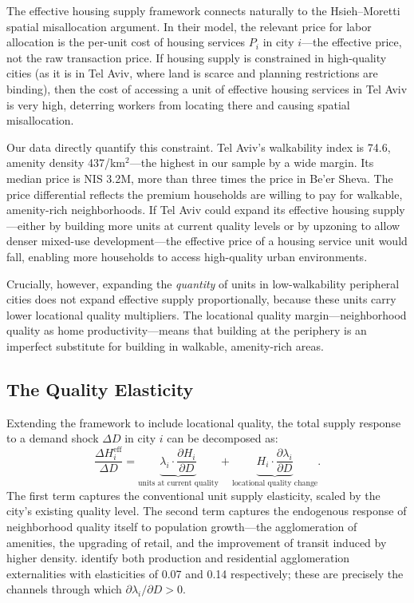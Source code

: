 \documentclass[12pt,a4paper]{article}
\begin{document}
The effective housing supply framework connects naturally to the Hsieh--Moretti
spatial misallocation argument.  In their model, the relevant price for labor
allocation is the per-unit cost of housing services $P_i$ in city $i$—the
effective price, not the raw transaction price.  If housing supply is
constrained in high-quality cities (as it is in Tel Aviv, where land is scarce
and planning restrictions are binding), then the cost of accessing a unit of
effective housing services in Tel Aviv is very high, deterring workers from
locating there and causing spatial misallocation.

Our data directly quantify this constraint.  Tel Aviv's walkability index is 74.6,
amenity density 437/km$^2$—the highest in our sample by a wide margin.  Its
median price is NIS 3.2M, more than three times the price in Be'er Sheva.
The price differential reflects the premium households are willing to pay for
walkable, amenity-rich neighborhoods.  If Tel Aviv could expand its effective
housing supply—either by building more units at current quality levels or by
upzoning to allow denser mixed-use development—the effective price of a housing
service unit would fall, enabling more households to access high-quality urban
environments.

Crucially, however, expanding the \textit{quantity} of units in low-walkability
peripheral cities does not expand effective supply proportionally, because these
units carry lower locational quality multipliers.  The locational quality
margin—neighborhood quality as home productivity—means that building at the
periphery is an imperfect substitute for building in walkable, amenity-rich
areas.

\subsection{The Quality Elasticity}
\label{sec:theory_elasticity}

Extending the \citet{baumsnow2024} framework to include locational quality,
the total supply response to a demand shock $\Delta D$ in city $i$ can be
decomposed as:
\begin{equation}
\label{eq:supply_decomp}
  \frac{\Delta H_i^{\text{eff}}}{\Delta D}
    = \underbrace{\lambda_i \cdot \frac{\partial H_i}{\partial D}}_{\text{units at current quality}}
    + \underbrace{H_i \cdot \frac{\partial \lambda_i}{\partial D}}_{\text{locational quality change}}.
\end{equation}
The first term captures the conventional unit supply elasticity, scaled by the
city's existing quality level.  The second term captures the endogenous
response of neighborhood quality itself to population growth—the agglomeration
of amenities, the upgrading of retail, and the improvement of transit induced
by higher density.  \citet{ahlfeldt2015} identify both production and
residential agglomeration externalities with elasticities of 0.07 and 0.14
respectively; these are precisely the channels through which $\partial \lambda_i /
\partial D > 0$.
\end{document}
